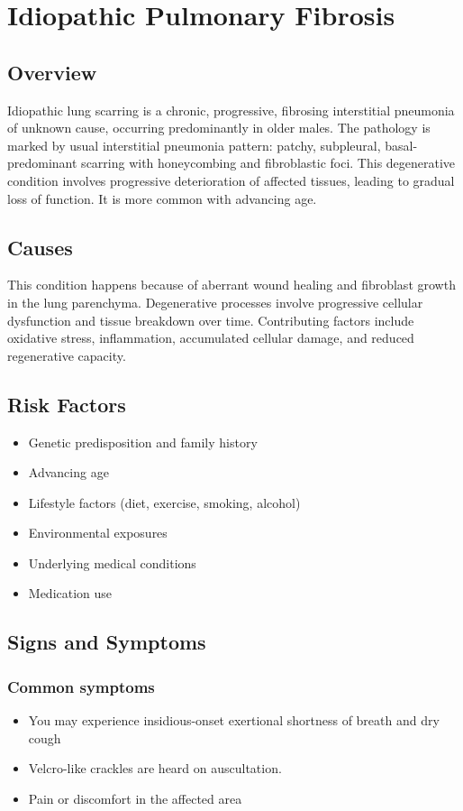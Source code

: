 \chapter{Idiopathic Pulmonary Fibrosis}
\label{sec:Idiopathic Pulmonary Fibrosis}

\section{Overview}
Idiopathic lung scarring is a chronic, progressive, fibrosing interstitial pneumonia of unknown cause, occurring predominantly in older males. The pathology is marked by usual interstitial pneumonia pattern: patchy, subpleural, basal-predominant scarring with honeycombing and fibroblastic foci. This degenerative condition involves progressive deterioration of affected tissues, leading to gradual loss of function. It is more common with advancing age.
\section{Causes}
This condition happens because of aberrant wound healing and fibroblast growth in the lung parenchyma. Degenerative processes involve progressive cellular dysfunction and tissue breakdown over time. Contributing factors include oxidative stress, inflammation, accumulated cellular damage, and reduced regenerative capacity.    
\section{Risk Factors}

\begin{itemize}[noitemsep]
  \item Genetic predisposition and family history
  \item Advancing age
  \item Lifestyle factors (diet, exercise, smoking, alcohol)
  \item Environmental exposures
  \item Underlying medical conditions
  \item Medication use
\end{itemize}
\section{Signs and Symptoms}

\subsection{Common symptoms}
\begin{itemize}[noitemsep]
  \item You may experience insidious-onset exertional shortness of breath and dry cough
  \item Velcro-like crackles are heard on auscultation.
  \item Pain or discomfort in the affected area
  \end{itemize}

